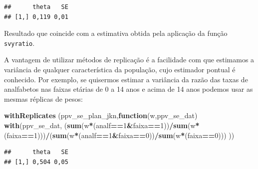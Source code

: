 \documentclass[]{book}
\newenvironment{Shaded}{\begin{snugshade}}{\end{snugshade}}
\newcommand{\KeywordTok}[1]{\textcolor[rgb]{0.13,0.29,0.53}{\textbf{#1}}}
\newcommand{\DecValTok}[1]{\textcolor[rgb]{0.00,0.00,0.81}{#1}}
\newcommand{\ControlFlowTok}[1]{\textcolor[rgb]{0.13,0.29,0.53}{\textbf{#1}}}
\newcommand{\OperatorTok}[1]{\textcolor[rgb]{0.81,0.36,0.00}{\textbf{#1}}}
\newcommand{\NormalTok}[1]{#1}
\theoremstyle{definition}
\theoremstyle{definition}
\theoremstyle{definition}
\theoremstyle{remark}
\begin{document}
\begin{Shaded}
\end{Shaded}

\begin{verbatim}
##      theta   SE
## [1,] 0,119 0,01
\end{verbatim}

Resultado que coincide com a estimativa obtida pela aplicação da função
\texttt{svyratio}.

A vantagem de utilizar métodos de replicação é a facilidade com que
estimamos a variância de qualquer característica da população, cujo
estimador pontual é conhecido. Por exemplo, se quisermos estimar a
variância da razão das taxas de analfabetos nas faixas etárias de 0 a 14
anos e acima de 14 anos podemos usar as mesmas réplicas de pesos:

\begin{Shaded}
\begin{Highlighting}[]
\KeywordTok{withReplicates}\NormalTok{ (ppv_se_plan_jkn,}\ControlFlowTok{function}\NormalTok{(w,ppv_se_dat) }\KeywordTok{with}\NormalTok{(ppv_se_dat,}
\NormalTok{(}\KeywordTok{sum}\NormalTok{(w}\OperatorTok{*}\NormalTok{(analf}\OperatorTok{==}\DecValTok{1}\OperatorTok{&}\NormalTok{faixa}\OperatorTok{==}\DecValTok{1}\NormalTok{))}\OperatorTok{/}\KeywordTok{sum}\NormalTok{(w}\OperatorTok{*}\NormalTok{(faixa}\OperatorTok{==}\DecValTok{1}\NormalTok{)))}\OperatorTok{/}\NormalTok{(}\KeywordTok{sum}\NormalTok{(w}\OperatorTok{*}\NormalTok{(analf}\OperatorTok{==}\DecValTok{1}\OperatorTok{&}\NormalTok{faixa}\OperatorTok{==}\DecValTok{0}\NormalTok{))}\OperatorTok{/}\KeywordTok{sum}\NormalTok{(w}\OperatorTok{*}\NormalTok{(faixa}\OperatorTok{==}\DecValTok{0}\NormalTok{)))}
\NormalTok{))  }
\end{Highlighting}
\end{Shaded}

\begin{verbatim}
##      theta   SE
## [1,] 0,504 0,05
\end{verbatim}
\end{document}
